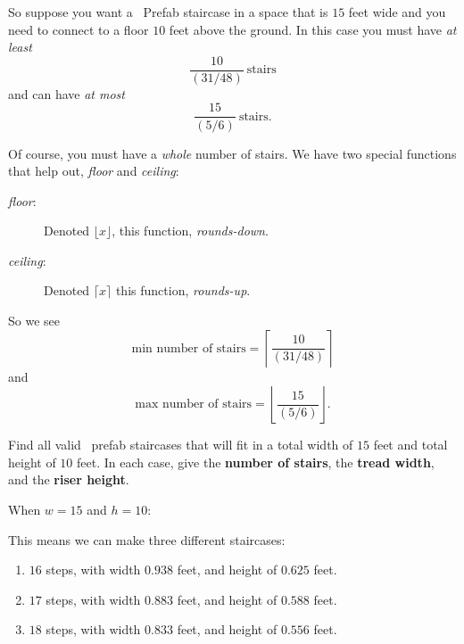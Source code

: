 \documentclass[noauthor,nooutcomes,handout,12pt]{ximera}
\begin{document}
So suppose you want a \mooculus~Prefab staircase in a space that is
$15$ feet wide and you need to connect to a floor $10$ feet above the
ground. In this case you must have \emph{at least}
\[
\frac{10}{\left(31/48\right)} \ \text{stairs}
\]
and can have \emph{at most}
\[
\frac{15}{\left(5/6\right)} \ \text{stairs}.
\]


Of course, you must have a \emph{whole} number of stairs. We have two special functions that help out, \emph{floor} and \emph{ceiling}:
\begin{description}
\item[\emph{floor}:] Denoted $\lfloor x\rfloor$, this function, \emph{rounds-down}.
\item[\emph{ceiling}:] Denoted $\lceil x\rceil$ this function, \emph{rounds-up}.
\end{description}
So we see
\[
\text{min number of stairs} = \left\lceil \frac{10}{\left(31/48\right)} \right\rceil
\]
and
\[
\text{max number of stairs} = \left\lfloor \frac{15}{\left(5/6\right)} \right\rfloor.
\]


\mynewpage


\begin{question}
  Find all valid \mooculus~prefab staircases that will fit in a total
  width of $15$ feet and total height of $10$ feet. In each case, give
  the \textbf{number of stairs}, the \textbf{tread width}, and the
  \textbf{riser height}.

  \begin{freeResponse}
  When $w=15$ and $h=10$:
  
  This means we can make three different staircases:
  \begin{enumerate}
  \item $16$ steps, with width $0.938$ feet, and height of $0.625$ feet.
  \item $17$ steps, with width $0.883$ feet, and height of $0.588$ feet.
  \item $18$ steps, with width $0.833$ feet, and height of $0.556$ feet.
  \end{enumerate}
  \end{freeResponse}
\end{question}


\mynewpage
\end{document}
